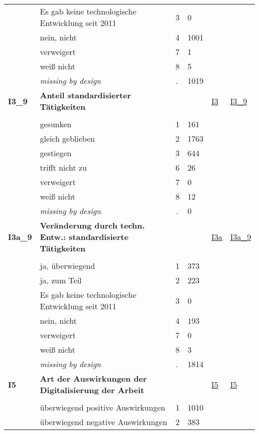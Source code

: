 \begin{longtable}{| L{2.45cm} | L{6cm} | C{1.5cm} | R{1cm} | C{2.25cm} | C{2.25cm} |}
   & Es gab keine technologische Entwicklung seit 2011 & 3 & 0 &  &  \\ 
   & nein, nicht & 4 & 1001 &  &  \\ 
   & verweigert & 7 & 1 &  &  \\ 
   & weiß nicht & 8 & 5 &  &  \\ 
   & \textit{missing by design} & \textit{.} & 1019 &  &  \\ 
   \midrule
\textbf{I3\_9}\label{var:I3:9} & \textbf{Anteil standardisierter Tätigkeiten} &  &  & \hyperref[I3]{I3} & \hyperref[var:suf:I3:9]{I3\_9} \\ 
   &  &  &  &  &  \\ 
   & gesunken & 1 & 161 &  &  \\ 
   & gleich geblieben & 2 & 1763 &  &  \\ 
   & gestiegen & 3 & 644 &  &  \\ 
   & trifft nicht zu & 6 & 26 &  &  \\ 
   & verweigert & 7 & 0 &  &  \\ 
   & weiß nicht & 8 & 12 &  &  \\ 
   & \textit{missing by design} & \textit{.} & 0 &  &  \\ 
   \midrule
\textbf{I3a\_9}\label{var:I3a:9} & \textbf{Veränderung durch techn. Entw.: standardisierte Tätigkeiten} &  &  & \hyperref[I3a]{I3a} & \hyperref[var:suf:I3a:9]{I3a\_9} \\ 
   &  &  &  &  &  \\ 
   & ja, überwiegend & 1 & 373 &  &  \\ 
   & ja, zum Teil & 2 & 223 &  &  \\ 
   & Es gab keine technologische Entwicklung seit 2011 & 3 & 0 &  &  \\ 
   & nein, nicht & 4 & 193 &  &  \\ 
   & verweigert & 7 & 0 &  &  \\ 
   & weiß nicht & 8 & 3 &  &  \\ 
   & \textit{missing by design} & \textit{.} & 1814 &  &  \\ 
   \midrule
\textbf{I5}\label{var:I5} & \textbf{Art der Auswirkungen der Digitalisierung der Arbeit} &  &  & \hyperref[I5]{I5} & \hyperref[var:suf:I5]{I5} \\ 
   &  &  &  &  &  \\ 
   & überwiegend positive Auswirkungen & 1 & 1010 &  &  \\ 
   & überwiegend negative Auswirkungen & 2 & 383 &  &  \\ 

\end{longtable}
